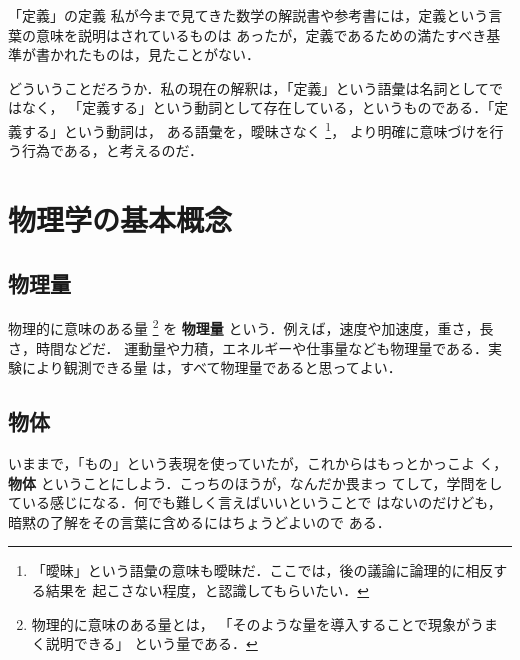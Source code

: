 \begin{memo}{「定義」の定義}
                私が今まで見てきた数学の解説書や参考書には，定義という言葉の意味を説明はされているものは
                あったが，定義であるための満たすべき基準が書かれたものは，見たことがない．

                どういうことだろうか．私の現在の解釈は，「定義」という語彙は名詞としてではなく，
                「定義する」という動詞として存在している，というものである．「定義する」という動詞は，
                ある語彙を，曖昧さなく
                    \footnote{
                        「曖昧」という語彙の意味も曖昧だ．ここでは，後の議論に論理的に相反する結果を
                        起こさない程度，と認識してもらいたい．
                    }，
                より明確に意味づけを行う行為である，と考えるのだ．
            \end{memo}

    \section{物理学の基本概念}
        \subsection{物理量}
            物理的に意味のある量
                \footnote{
                    物理的に意味のある量とは，
                    「そのような量を導入することで現象がうまく説明できる」
                    という量である．
                }
            を \textbf{物理量} という．例えば，速度や加速度，重さ，長さ，時間などだ．
            運動量や力積，エネルギーや仕事量なども物理量である．実験により観測できる量
            は，すべて物理量であると思ってよい．

        \subsection{物体}
            いままで，「もの」という表現を使っていたが，これからはもっとかっこよ
            く，\textbf{物体} ということにしよう．こっちのほうが，なんだか畏まっ
            てして，学問をしている感じになる．何でも難しく言えばいいということで
            はないのだけども，暗黙の了解をその言葉に含めるにはちょうどよいので
            ある．

